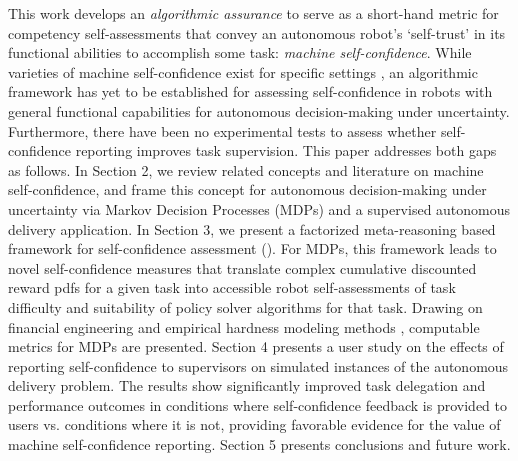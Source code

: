 This work develops an \emph{algorithmic assurance} \cite{Israelsen2019-to} to serve as a short-hand metric for competency self-assessments that convey an autonomous robot's `self-trust' in its functional abilities to accomplish some task: \emph{machine self-confidence}. While varieties of machine self-confidence exist for specific settings \cite{Hutchins2015-if, Kuter2015-qh,Sweet2016-tz,  Zagorecki2015-qy}, an algorithmic framework has yet to be established for assessing self-confidence in robots with general functional capabilities for autonomous decision-making under uncertainty. Furthermore, there have been no experimental tests to assess whether self-confidence reporting improves task supervision. %
%
This paper addresses both gaps as follows. 
In Section 2, we review related concepts and literature on machine self-confidence, and frame this concept for autonomous decision-making under uncertainty via Markov Decision Processes (MDPs) and a supervised autonomous delivery application. 
In Section 3, we present a factorized meta-reasoning based framework for self-confidence assessment (\famsec). For MDPs, this framework leads to novel self-confidence measures that translate complex cumulative discounted reward pdfs for a given task into accessible robot self-assessments of task difficulty and suitability of policy solver algorithms for that task. 
Drawing on financial engineering \cite{wojt2009portfolio} and empirical hardness modeling methods \cite{Leyton-Brown2009-yr}, computable metrics for MDPs are presented. %
Section 4 presents a user study on the effects of reporting self-confidence to supervisors on simulated instances of the autonomous delivery problem. The results show significantly improved task delegation and performance outcomes in conditions where self-confidence feedback is provided to users vs. conditions where it is not, providing favorable evidence for the value of machine self-confidence reporting. Section 5 presents conclusions and future work. %
